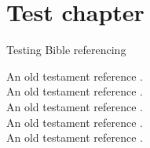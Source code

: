 \documentclass[twoside,14pt,onecolumn,openright ,a4paper]{book}
\begin{document}
    \chapter{Test chapter}
        \beginnumbering
        \pstart
        \lipsum[1]
    Testing Bible referencing 
    \lipsum[1]
    \pend

        \pstart 
    \lipsum[1]


        An old testament reference .\\
        An old testament reference .\\
        An old testament reference .\\
        An old testament reference .\\
        An old testament reference .\\
        \lipsum[1]
        \pend
        \endnumbering

        \backmatter

        \printindex[bible]
    
\end{document}
